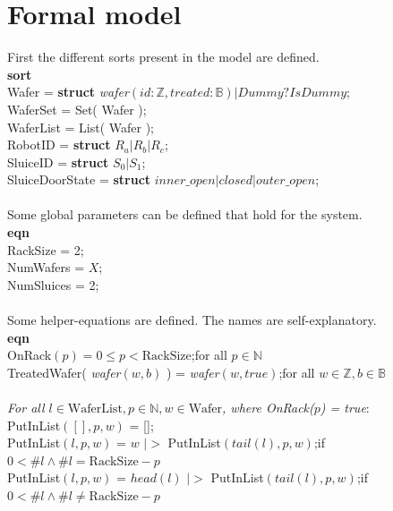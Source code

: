 \documentclass[12pt]{report}
\begin{document}
	\section{Formal model}
	First the different sorts present in the model are defined.\\
	\textbf{sort}\\
	\phantom{----} Wafer = \textbf{struct} \emph{wafer}$( id:\mathbb{Z}, treated:\mathbb{B} ) | Dummy?IsDummy$;\\
	\phantom{----} WaferSet = Set( Wafer );\\
	\phantom{----} WaferList = List( Wafer );\\
	\phantom{----} RobotID = \textbf{struct} $R_a | R_b | R_c$;\\
	\phantom{----} SluiceID = \textbf{struct} $S_0 | S_1$;\\
	\phantom{----} SluiceDoorState = \textbf{struct} $inner\_open|closed|outer\_open$;\\
	\\
	Some global parameters can be defined that hold for the system.\\
	\textbf{eqn}\\
	\phantom{----} RackSize = 2;\\
	\phantom{----} NumWafers = $X$;\\
	\phantom{----} NumSluices = 2;\\
	\\
	Some helper-equations are defined. The names are self-explanatory.\\
	\textbf{eqn}\\
	\phantom{----} OnRack$( p ) = 0 \leq p < \text{RackSize}$;\hfill for all $p \in \mathbb{N}$\\
	\phantom{----} TreatedWafer(  \emph{wafer}$( w, b )$ ) =  \emph{wafer}$( w, true )$;\hfill for all $w \in \mathbb{Z}, b \in \mathbb{B}$\\
	\\
	\phantom{----} \emph{For all $l \in \text{WaferList}, p \in \mathbb{N}, w \in \text{Wafer}$, where OnRack($p$) = true}:\\
	\phantom{----} PutInList$( [], p, w )$ = [];\\
	\phantom{----} PutInList$( l, p, w )$ = $w$ $|>$ PutInList$( tail( l ), p, w )$;\hfill if $0 < \#l \land \#l = \text{RackSize} - p$\\
	\phantom{----} PutInList$( l, p, w )$ = $ head( l )$ $|>$ PutInList$( tail( l ), p, w )$;\hfill if $0 < \#l \land \#l \neq \text{RackSize} - p$\\
\end{document}
